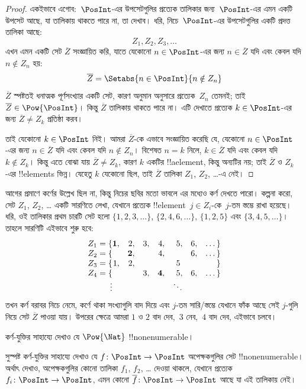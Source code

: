 \documentclass[../../../include/open-logic-section]{subfiles}
\begin{document}
\begin{proof}
একইভাবে এগোব:~$\PosInt$-এর উপসেটগুলির প্রত্যেক তালিকার জন্য~$\PosInt$-এর এমন একটি উপসেট আছে, যা তালিকায় থাকতে পারে না, তা দেখাব। ধরি, নিচে~$\PosInt$-এর উপসেটগুলির একটি প্রদত্ত তালিকা আছে:
\[
Z_{1}, Z_{2}, Z_{3}, \dots
\]
এখন এমন একটি সেট $\overline{Z}$ সংজ্ঞায়িত করি, যাতে যেকোনো $n \in \PosInt$-এর জন্য $n \in \overline{Z}$ যদি এবং কেবল যদি $n \notin Z_{n}$ হয়:
\[
\overline{Z} = \Setabs{n \in \PosInt}{n \notin Z_n}
\]
$\overline{Z}$ স্পষ্টতই ধনাত্মক পূর্ণসংখ্যার একটি সেট, কারণ অনুমান অনুসারে প্রত্যেক~$Z_n$ তেমনই; তাই $\overline{Z} \in \Pow{\PosInt}$। কিন্তু $\overline{Z}$ তালিকায় থাকতে পারে না। এটি দেখাতে প্রত্যেক $k \in \PosInt$-এর জন্য $\overline{Z} \neq Z_k$ প্রতিষ্ঠা করব।

তাই যেকোনো $k \in \PosInt$ নিই। আমরা $\overline{Z}$-কে এভাবে সংজ্ঞায়িত করেছি যে, যেকোনো $n \in \PosInt$-এর জন্য $n \in \overline{Z}$ যদি এবং কেবল যদি $n \notin Z_n$। বিশেষত $n=k$ নিলে, $k \in \overline{Z}$ যদি এবং কেবল যদি $k \notin Z_k$। কিন্তু এতে বোঝা যায় $\overline{Z} \neq Z_k$, কারণ $k$ একটির !!a{element}, কিন্তু অন্যটির নয়; তাই $\overline{Z}$ ও $Z_k$-এর !!{element}s ভিন্ন। যেহেতু $k$ যেকোনো ছিল, তাই $\overline{Z}$ তালিকা $Z_1$, $Z_2$, \dots{}-এ নেই।
\end{proof}

\begin{explain}
আগের প্রমাণে কর্ণের উল্লেখ ছিল না, কিন্তু নিচের ছবির মতো ভাবলে এর মধ্যেও কর্ণ দেখতে পারো। কল্পনা করো, সেট $Z_1$, $Z_2$, \dots{} একটি সারণিতে লেখা, যেখানে প্রত্যেক !!{element}~$j \in Z_i$-কে~$j$-তম স্তম্ভে রাখা হয়েছে। ধরি, ওই তালিকার প্রথম চারটি সেট হলো $\{1,2,3,\dots\}$, $\{2, 4, 6, \dots\}$, $\{1,2,5\}$ এবং $\{3,4,5,\dots\}$। তাহলে সারণিটি এইভাবে শুরু হবে:
\[
\begin{array}{r@{}rrrrrrr}
  Z_1 = \{ & \mathbf{1}, & 2, & 3, & 4, & 5, & 6, & \dots\}\\
  Z_2 = \{ &  & \mathbf{2}, &  & 4, &  & 6, & \dots\}\\
  Z_3 = \{ & 1, & 2, &  &  & 5\phantom{,} &  & \}\\
  Z_4 = \{ &  &  & 3, & \mathbf{4}, & 5, & 6, & \dots\}\\
  \vdots & & & & & \ddots
\end{array}
\]
তখন কর্ণ বরাবর নিচে নেমে, কর্ণে থাকা সংখ্যাগুলি বাদ দিয়ে এবং $j$-তম সারি/স্তম্ভে যেখানে ফাঁক আছে সেই $j$-গুলি নিয়ে সেট $\overline{Z}$ পাওয়া যায়। উপরের ক্ষেত্রে আমরা $1$ ও $2$ বাদ দেব,~$3$ নেব,~$4$ বাদ দেব, এইভাবে চলবে।
\end{explain}

\begin{prob}
কর্ণ-যুক্তির সাহায্যে দেখাও যে $\Pow{\Nat}$ !!{nonenumerable}।
\end{prob}

\begin{prob}\label{sfr:siz:nen:prob:f-posint}
সুস্পষ্ট কর্ণ-যুক্তির সাহায্যে দেখাও যে $f \colon \PosInt \to \PosInt$ অপেক্ষকগুলির সেট !!{nonenumerable}। অর্থাৎ দেখাও, অপেক্ষকগুলির কোনো তালিকা $f_1$, $f_2$, \dots{} দেওয়া থাকলে, যেখানে প্রত্যেক $f_i\colon \PosInt \to \PosInt$, এমন কোনো $\overline{f}\colon \PosInt \to \PosInt$ আছে যা এই তালিকায় নেই।
\end{prob}
\end{document}
